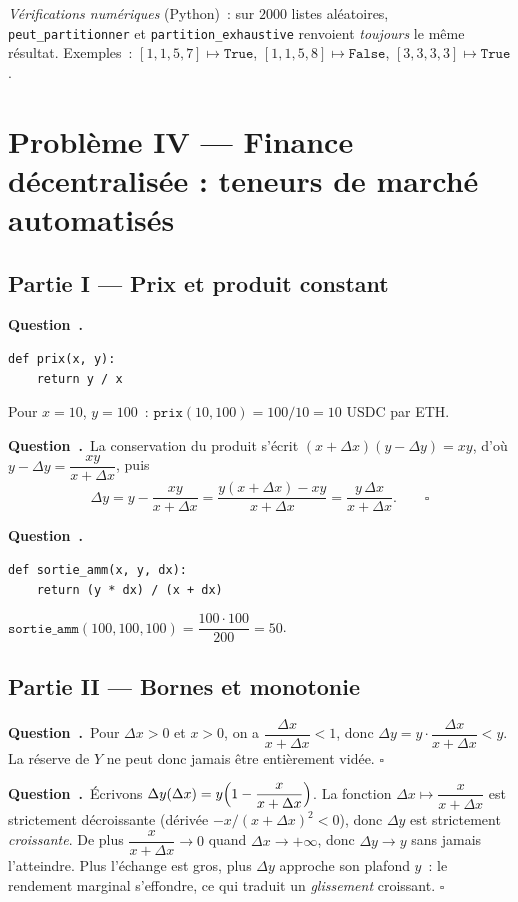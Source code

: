 \documentclass[11pt,a4paper]{article}
\newcounter{qcnt}
\newcommand{\Q}{\medskip\par\stepcounter{qcnt}\noindent\textbf{Question~\theqcnt.}~}
\newcommand{\code}[1]{\lstinline!#1!}
\begin{document}
\medskip
\noindent\emph{Vérifications numériques} (Python)~: sur $2000$ listes aléatoires,
\code{peut_partitionner} et \code{partition_exhaustive} renvoient \emph{toujours} le même résultat.
Exemples~: $[1,1,5,7]\mapsto\mathtt{True}$, $[1,1,5,8]\mapsto\mathtt{False}$,
$[3,3,3,3]\mapsto\mathtt{True}$.

\clearpage
\section*{Problème IV --- Finance décentralisée : teneurs de marché automatisés}
\subsection*{Partie I --- Prix et produit constant}

\Q
\begin{lstlisting}
def prix(x, y):
    return y / x
\end{lstlisting}
Pour $x=10$, $y=100$~: $\mathtt{prix}(10,100) = 100/10 = 10$ USDC par ETH.

\Q La conservation du produit s'écrit $(x+\Delta x)(y-\Delta y) = xy$, d'où
$y - \Delta y = \dfrac{xy}{x+\Delta x}$, puis
$$\Delta y = y - \frac{xy}{x+\Delta x} = \frac{y(x+\Delta x) - xy}{x+\Delta x}
= \frac{y\,\Delta x}{x+\Delta x}. \qquad \square$$

\Q
\begin{lstlisting}
def sortie_amm(x, y, dx):
    return (y * dx) / (x + dx)
\end{lstlisting}
$\mathtt{sortie\_amm}(100,100,100) = \dfrac{100\cdot100}{200} = 50$.

\subsection*{Partie II --- Bornes et monotonie}

\Q Pour $\Delta x > 0$ et $x > 0$, on a $\dfrac{\Delta x}{x+\Delta x} < 1$, donc
$\Delta y = y\cdot\dfrac{\Delta x}{x+\Delta x} < y$. La réserve de $Y$ ne peut donc jamais être
entièrement vidée. $\square$

\Q Écrivons $\Delta y(\Delta x) = y\Bigl(1 - \dfrac{x}{x+\Delta x}\Bigr)$. La fonction
$\Delta x \mapsto \dfrac{x}{x+\Delta x}$ est strictement décroissante (dérivée
$-x/(x+\Delta x)^2 < 0$), donc $\Delta y$ est strictement \emph{croissante}. De plus
$\dfrac{x}{x+\Delta x} \to 0$ quand $\Delta x \to +\infty$, donc $\Delta y \to y$ sans jamais
l'atteindre. Plus l'échange est gros, plus $\Delta y$ approche son plafond $y$~: le rendement
marginal s'effondre, ce qui traduit un \emph{glissement} croissant. $\square$
\end{document}
